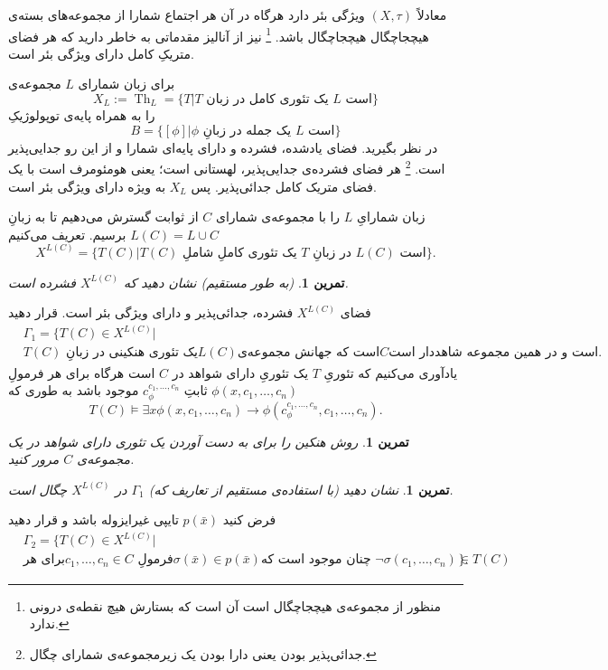 \documentclass[12pt,a4paper]{report}
\theoremstyle{colorhead}
\newtheorem{tam}[thm]{تمرین}
\DeclareMathOperator{\Th}{Th}
\begin{document}
معادلاً 
$(X,\tau)$
ويژگی بئر دارد هرگاه در آن هر اجتماع شمارا از مجموعه‌های بسته‌ی
	هیچجاچگال
هیچجاچگال باشد.
\footnote{منظور از مجموعه‌ی هیچجاچگال است آن است که بستارش هیچ نقطه‌ی درونی ندارد.}
نیز 
از آنالیز مقدماتی به خاطر دارید که هر فضای متریکِ کامل دارای ویژگی
بئر است. 
\par 
برای زبان شمارای 
$L$
مجموعه‌ی
\[
X_L:=\Th_L=\{T|\text{$T$ یک تئوری کامل در زبان $L$ است}\}
\]
را
به همراه پایه‌ی توپولوژیکِ
\[
B=\{[\phi]|\text{$\phi$ یک جمله در زبانِ $L$ است}\}
\]
در نظر بگیرید. فضای یادشده، فشرده و دارای پایه‌ای شمارا و از این رو جدایی‌پذیر
است. 
\footnote{جدائی‌پذیر بودن یعنی دارا بودن یک زیرمجموعه‌ی شمارای چگال.}
هر فضای فشرده‌ی جدایی‌پذیر، لهستانی
است؛ یعنی هومئومرف است با یک فضای متریک کامل جدائی‌پذیر. پس 
$X_L$
به ویژه دارای ویژگی بئر است. 
\par 
زبان شمارایِ
$L$
را با مجموعه‌ی شمارای
$C$
از ثوابت گسترش می‌دهیم تا به زبانِ
\mbox{$L(C)=L\cup C$}
برسیم.  تعریف می‌کنیم
\[ X^{L(C)}=\{T(C)|\text{$T(C)$ یک تئوری کاملِ  شاملِ $T$ در زبانِ $L(C)$ است}\}.\]
\begin{tam}
(به طور مستقیم)
نشان دهید که
$X^{L(C)}$
فشرده است.
\end{tam}
فضای
$X^{L(C)}$
فشرده، جدائی‌پذیر  و دارای ویژگی بئر است. قرار دهید
\begin{align*}
& \Gamma_1=\{T(C)\in X^{L(C)}|
\\
&
\text{$T(C)$ یک تئوری هنکینی در زبانِ
$L(C)$
است که جهانش مجموعه‌ی
$C$
است و در همین مجموعه‌ 
شاهددار است.
}
\end{align*}
یادآوری می‌کنیم که تئوریِ
$T$
یک تئوریِ دارای شواهد در
$C$
است هرگاه برای هر فرمولِ
$\phi(x,c_1,\ldots,c_n)$
ثابتِ
$c_\phi^{c_1,\ldots,c_n}$
موجود باشد به طوری که 
\[
T(C)\models \exists x\phi(x,c_1,\ldots,c_n)\to \phi(c_\phi^{c_1,\ldots,c_n},c_1,\ldots,c_n).
\]
\begin{tam}
روش هنکین را برای به دست آوردن یک تئوری دارای شواهد در یک مجموعه‌ی
$C$
مرور کنید.
\end{tam}
\begin{tam}
نشان دهید (با استفاده‌ی مستقیم از تعاریف که)
$\Gamma_1$
در
$X^{L(C)}$
چگال است.
\end{tam}
فرض کنید
$p(\bar{x})$
تایپی غیرایزوله باشد و قرار دهید
\begin{align*}
& \Gamma_2=\{T(C)\in X^{L(C)}|
\\
&  \text{برای هر
$c_1,\ldots,c_n\in C$ فرمولِ
$\sigma(\bar{x})\in p(\bar{x})$
چنان موجود است که 
$\neg \sigma(c_1,\ldots,c_n)\in T(C)$
}\}.
\end{align*}
\end{document}
